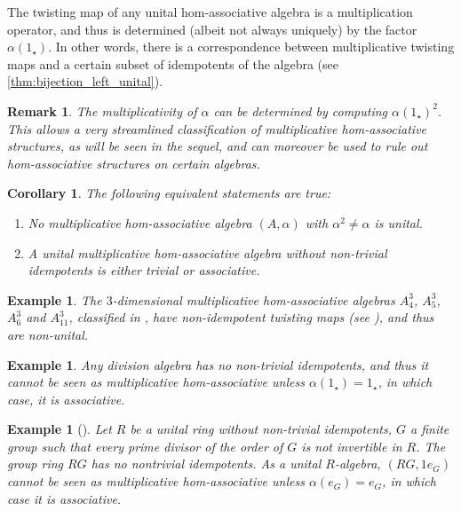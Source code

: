 \documentclass[12pt]{article}
\newtheorem{corollary}[theorem]{Corollary}
\newtheorem{example}[theorem]{Example}
\newtheorem{remark}[theorem]{Remark}
\begin{document}
		The twisting map of any unital hom-associative algebra is a multiplication operator, and thus is determined (albeit not always uniquely) by the factor $\alpha(1_\star)$. In other words, there is a correspondence between multiplicative twisting maps and a certain subset of idempotents of the algebra (see \cref{thm:bijection_left_unital}).
		
		\begin{remark}
			The multiplicativity of $\alpha$ can be determined by computing $\alpha(1_\star)^2$. This allows a very streamlined classification of multiplicative hom-associative structures, as will be seen in the sequel, and can moreover be used to rule out hom-associative structures on certain algebras.
		\end{remark}
		
		
		\begin{corollary}
			The following equivalent statements are true:
			\begin{enumerate}[label=\textnormal{\arabic*)}]
				\item No multiplicative hom-associative algebra $(A,\alpha)$ with $\alpha^2\neq\alpha$ is unital.
				\item A unital multiplicative hom-associative algebra without non-trivial idempotents is either trivial or associative.
			\end{enumerate}
		\end{corollary}
		
		\begin{example}
			The $3$-dimensional multiplicative hom-associative algebras $A_4^3$, $A_5^3$,  $A_6^3$ and $A_{11}^3$, classified in \textnormal{\cite{MakZah:HAclassification}}, have non-idempotent twisting maps {\rm (}see \textnormal{\cite{GarButSil:ZeroDivision}}{\rm )}, and thus are non-unital.
		\end{example}
		
		\begin{example}
			Any division algebra has no non-trivial idempotents, and thus it cannot be seen as multiplicative hom-associative unless $\alpha(1_\star)=1_\star$, in which case, it is associative.
		\end{example}
		
		\begin{example}[\!\!\cite{SehZas:GRidempotents}]
			Let $R$ be a unital ring without non-trivial idempotents, $G$ a finite group such that every prime divisor of the order of $G$ is not invertible in $R$. The group ring $RG$ has no nontrivial idempotents. As a unital $R$-algebra, $(RG,1e_G)$ cannot be seen as multiplicative hom-associative unless $\alpha(e_G)=e_G$, in which case it is associative.
		\end{example}
		
\end{document}
